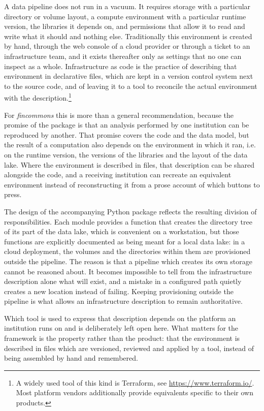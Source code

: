 \documentclass[a4paper, 11pt]{report}
\begin{document}
A data pipeline does not run in a vacuum. It requires storage with a particular directory or volume layout, a compute environment with a particular runtime version, the libraries it depends on, and permissions that allow it to read and write what it should and nothing else. Traditionally this environment is created by hand, through the web console of a cloud provider or through a ticket to an infrastructure team, and it exists thereafter only as settings that no one can inspect as a whole. Infrastructure as code is the practice of describing that environment in declarative files, which are kept in a version control system next to the source code, and of leaving it to a tool to reconcile the actual environment with the description.\footnote{A widely used tool of this kind is Terraform, see \url{https://www.terraform.io/}. Most platform vendors additionally provide equivalents specific to their own products.}

For \emph{fincommons} this is more than a general recommendation, because the promise of the package is that an analysis performed by one institution can be reproduced by another. That promise covers the code and the data model, but the result of a computation also depends on the environment in which it ran, i.e. on the runtime version, the versions of the libraries and the layout of the data lake. Where the environment is described in files, that description can be shared alongside the code, and a receiving institution can recreate an equivalent environment instead of reconstructing it from a prose account of which buttons to press.

The design of the accompanying Python package reflects the resulting division of responsibilities. Each module provides a function that creates the directory tree of its part of the data lake, which is convenient on a workstation, but those functions are explicitly documented as being meant for a local data lake: in a cloud deployment, the volumes and the directories within them are provisioned outside the pipeline. The reason is that a pipeline which creates its own storage cannot be reasoned about. It becomes impossible to tell from the infrastructure description alone what will exist, and a mistake in a configured path quietly creates a new location instead of failing. Keeping provisioning outside the pipeline is what allows an infrastructure description to remain authoritative.

Which tool is used to express that description depends on the platform an institution runs on and is deliberately left open here. What matters for the framework is the property rather than the product: that the environment is described in files which are versioned, reviewed and applied by a tool, instead of being assembled by hand and remembered.
\end{document}
